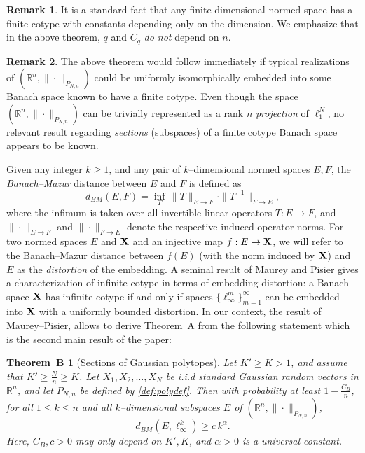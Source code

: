 \documentclass[11pt]{amsart}
\newtheorem*{theoremB*}{Theorem~B}
\theoremstyle{definition}
\newtheorem*{remark*}{Remark}
\theoremstyle{plain}
\newcommand{\R}{\mathbb{R}}
\def\R{{\mathbb R}}
\begin{document}
\begin{remark*}
It is a standard fact that any finite-dimensional normed space
has a finite cotype with constants depending only on the dimension.
We emphasize that in the above theorem, $q$ and $C_q$ {\it do not}
depend on $n$.    
\end{remark*}

\begin{remark*}
The above theorem would follow
immediately if typical realizations of $(\R^n,\|\cdot\|_{P_{N,n}})$
could be uniformly isomorphically embedded into some Banach space known to have
a finite cotype.
Even though the space $(\R^n,\|\cdot\|_{P_{N,n}})$
can be trivially represented as a rank $n$ {\it projection} of $\ell_1^N$,
no relevant result regarding {\it sections} (subspaces) of a
finite cotype Banach space appears to be known.
\end{remark*}

Given any integer $k\geq 1$,
and any pair of $k$--dimensional normed spaces $E,F$,
the {\it Banach--Mazur} distance between $E$ and $F$ 
is defined as
$$
d_{BM}(E,F)=\inf\limits_T\,\|T\|_{E\to F}\cdot\|T^{-1}\|_{F\to E},
$$
where the infimum is taken over all invertible 
linear operators $T:E\to F$, and $\|\cdot\|_{E\to F}$
and $\|\cdot\|_{F\to E}$ denote the respective induced operator
norms. 
For two normed spaces $E$ and ${\bf X}$ and an injective map $f:E\to{\bf X}$,
we will refer to the Banach--Mazur distance between $f(E)$ (with the norm induced by ${\bf X}$)
and $E$ as the {\it distortion} of the embedding.
A seminal result of Maurey and Pisier \cite{MP76}
gives a characterization of infinite cotype in terms of embedding distortion:
a Banach space ${\bf X}$ has infinite cotype
if and only if spaces
$\{\ell_\infty^m\}_{m=1}^\infty$
can be embedded into ${\bf X}$ with a uniformly bounded distortion.
In our context, the result of Maurey--Pisier, allows to derive Theorem~A from the following
statement which is the second main result of the paper:
\begin{theoremB*}[Sections of Gaussian polytopes]
Let $K'\geq K>1$, and assume that $K'\geq \frac{N}{n}\geq K$.
Let $X_1,X_2,\dots,X_N$
be i.i.d standard Gaussian random vectors in $\R^n$,
and let $P_{N,n}$ be defined by \eqref{def:polydef}.
Then with probability at least $1-\frac{C_B}{n}$,
for all $1\leq k\leq n$
and all $k$--dimensional subspaces $E$ of
$(\R^n,\|\cdot\|_{P_{N,n}})$,
$$
d_{BM}(E,\ell_\infty^k)\geq c\,k^\alpha.
$$
Here, $C_B,c>0$ may only depend on $K',K$,
and $\alpha>0$ is a universal constant.
\end{theoremB*}
\end{document}
